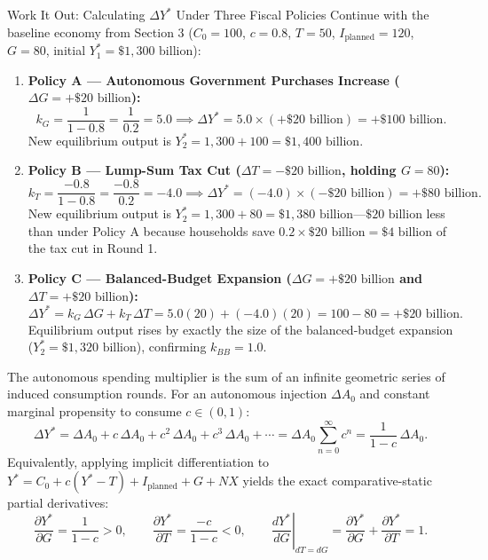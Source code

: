 \documentclass[11pt,letterpaper]{article}
\begin{document}
\begin{examplecase}{Work It Out: Calculating $\Delta Y^*$ Under Three Fiscal Policies}
Continue with the baseline economy from Section 3 ($C_0 = 100$, $c = 0.8$, $T = 50$, $I_{\text{planned}} = 120$, $G = 80$, initial $Y_1^* = \$1{,}300\text{ billion}$):
\begin{enumerate}
    \item \textbf{Policy A — Autonomous Government Purchases Increase ($\Delta G = +\$20\text{ billion}$):}
    \[
    k_G = \frac{1}{1 - 0.8} = \frac{1}{0.2} = 5.0 \implies \Delta Y^* = 5.0 \times (+\$20\text{ billion}) = +\$100\text{ billion}.
    \]
    New equilibrium output is $Y_2^* = 1{,}300 + 100 = \$1{,}400\text{ billion}$.
    \item \textbf{Policy B — Lump-Sum Tax Cut ($\Delta T = -\$20\text{ billion}$, holding $G = 80$):}
    \[
    k_T = \frac{-0.8}{1 - 0.8} = \frac{-0.8}{0.2} = -4.0 \implies \Delta Y^* = (-4.0) \times (-\$20\text{ billion}) = +\$80\text{ billion}.
    \]
    New equilibrium output is $Y_2^* = 1{,}300 + 80 = \$1{,}380\text{ billion}$—$\$20\text{ billion}$ less than under Policy A because households save $0.2 \times \$20\text{ billion} = \$4\text{ billion}$ of the tax cut in Round 1.
    \item \textbf{Policy C — Balanced-Budget Expansion ($\Delta G = +\$20\text{ billion}$ and $\Delta T = +\$20\text{ billion}$):}
    \[
    \Delta Y^* = k_G\,\Delta G + k_T\,\Delta T = 5.0(20) + (-4.0)(20) = 100 - 80 = +\$20\text{ billion}.
    \]
    Equilibrium output rises by exactly the size of the balanced-budget expansion ($Y_2^* = \$1{,}320\text{ billion}$), confirming $k_{BB} = 1.0$.
\end{enumerate}
\end{examplecase}

\begin{coreprinciple}
The autonomous spending multiplier is the sum of an infinite geometric series of induced consumption rounds. For an autonomous injection $\Delta A_0$ and constant marginal propensity to consume $c \in (0,1)$:
\[
\Delta Y^* = \Delta A_0 + c\,\Delta A_0 + c^2\,\Delta A_0 + c^3\,\Delta A_0 + \cdots = \Delta A_0 \sum_{n=0}^{\infty} c^n = \frac{1}{1 - c}\,\Delta A_0.
\]
Equivalently, applying implicit differentiation to $Y^* = C_0 + c(Y^* - T) + I_{\text{planned}} + G + NX$ yields the exact comparative-static partial derivatives:
\[
\frac{\partial Y^*}{\partial G} = \frac{1}{1 - c} > 0, \qquad \frac{\partial Y^*}{\partial T} = \frac{-c}{1 - c} < 0, \qquad \left.\frac{dY^*}{dG}\right|_{dT = dG} = \frac{\partial Y^*}{\partial G} + \frac{\partial Y^*}{\partial T} = 1.
\]
\end{coreprinciple}
\end{document}
